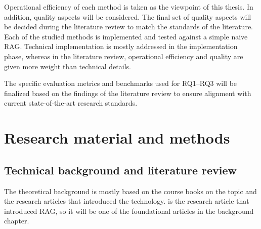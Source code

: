 \documentclass[12pt,a4paper,english,oneside]{article}
\begin{document}

Operational efficiency of each method is taken as the viewpoint of this thesis. In addition, quality aspects will be considered. The final set of quality aspects will be decided during the literature review to match the standards of the literature. Each of the studied methods is implemented and tested against a simple naive RAG. Technical implementation is mostly addressed in the implementation phase, whereas in the literature review, operational efficiency and quality are given more weight than technical details. 

The specific evaluation metrics and benchmarks used for RQ1–RQ3 will be finalized based on the findings of the literature review to ensure alignment with current state-of-the-art research standards.


\section{Research material and methods}
\label{section:research}

\subsection{Technical background and literature review}

The theoretical background is mostly based on the course books on the topic and the research articles that introduced the technology. \citep{lewis2020rag} is the research article that introduced RAG, so it will be one of the foundational articles in the background chapter.
\end{document}
